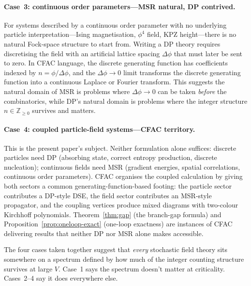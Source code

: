 \documentclass[11pt,a4paper]{article}
\theoremstyle{plain}
\begin{document}
\paragraph{Case~3: continuous order parameters---MSR natural, DP
contrived.}
For systems described by a continuous order parameter with no
underlying particle interpretation---Ising magnetisation, $\phi^4$
field, KPZ height---there is no natural Fock-space structure to
start from.  Writing a DP theory requires discretising the field
with an artificial lattice spacing $\Delta\phi$ that must later
be sent to zero.  In CFAC language, the discrete generating
function has coefficients indexed by $n = \phi/\Delta\phi$, and
the $\Delta\phi \to 0$ limit transforms the discrete generating
function into a continuous Laplace or Fourier transform.  This
suggests the natural domain of MSR is problems where
$\Delta\phi \to 0$ can be taken \emph{before} the combinatorics,
while DP's natural domain is problems where the integer structure
$n \in \mathbb{Z}_{\geq 0}$ survives and matters.

\paragraph{Case~4: coupled particle-field systems---CFAC territory.}
This is the present paper's subject.  Neither formulation alone
suffices: discrete particles need DP (absorbing state, correct
entropy production, discrete nucleation); continuous fields need
MSR (gradient energies, spatial correlations, continuous order
parameters).  CFAC organises the coupled calculation by giving
both sectors a common generating-function-based footing: the
particle sector contributes a DP-style DSE, the field sector
contributes an MSR-style propagator, and the coupling vertices
produce mixed diagrams with two-colour Kirchhoff polynomials.
Theorem~\ref{thm:gap} (the branch-gap formula) and
Proposition~\ref{prop:oneloop-exact} (one-loop exactness) are
instances of CFAC delivering results that neither DP nor MSR
alone makes accessible.

The four cases taken together suggest that \emph{every}
stochastic field theory sits somewhere on a spectrum defined by
how much of the integer counting structure survives at large $V$.
Case~1 says the spectrum doesn't matter at criticality.
Cases~2--4 say it does everywhere else.
\end{document}
